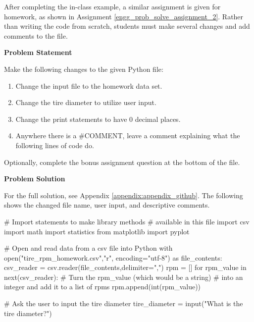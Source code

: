 After completing the in-class example, a similar assignment is given for homework, as shown in Assignment
\ref{engg_prob_solve_assignment_2}. Rather than writing the code from scratch, students must make several 
changes and add comments to the file.

\label{engg_prob_solve_assignment_2}

\begin{tcolorbox}[breakable, enhanced jigsaw, title=DEN 161: Assignment \ref{engg_prob_solve_assignment_2}, 
    colframe=ksu-purple, colback=ksu-gray]

    \textbf{Problem Statement}
    \parindent15pt

    Make the following changes to the given Python file:

    \begin{enumerate}
        \item Change the input file to the homework data set.
        \item Change the tire diameter to utilize user input.
        \item Change the print statements to have 0 decimal places.
        \item Anywhere there is a \#COMMENT, leave a comment explaining what the following lines of code do.
    \end{enumerate}
               
    Optionally, complete the bonus assignment question at the bottom of the file.
    

    \tcblower
    \textbf{Problem Solution}
    \parindent15pt

    For the full solution, see Appendix \ref{appendix:appendix_github}. The following shows the changed file
    name, user input, and descriptive comments.

\begin{python}
# Import statements to make library methods 
# available in this file
import csv
import math
import statistics
from matplotlib import pyplot

# Open and read data from a csv file into Python
with open("tire_rpm_homework.csv","r", 
          encoding="utf-8") as file_contents:
    csv_reader = csv.reader(file_contents,delimiter=",")
    rpm = []
    for rpm_value in next(csv_reader):
        # Turn the rpm_value (which would be a string) 
        # into an integer and add it to a list of rpms
        rpm.append(int(rpm_value))

# Ask the user to input the tire diameter
tire_diameter = input("What is the tire diameter?")
\end{python}
\end{tcolorbox}

